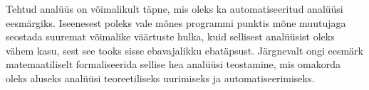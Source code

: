 \documentclass[../thesis.tex]{subfiles}
\begin{document}
\begin{itemize}
\begin{comment}
		Iseenesest poleks vale seostada selle programmi punktiga mõnda (osalise järjestuse järgi) üldisemat seisundit, nt $\{5, 6, 7\}$ või lausa $\top$, kuid see poleks nii kasulik, sest analüüsi mõte on siiski leida võimalikult täpne kirjeldus. Just selle täpsuse matemaatiliseks kirjeldamiseks nõutaksegi osalist järjestust.
	\item Punktiga 5 sobib samal põhjusel seostada element $\{3\}$.
	\item Punktis 6 on olukord huvitavam, sest seda seisundit pole programmis oleva hargnemise (täpsemalt selle ühendumise) tõttu kirjeldada ühe täisarvuga, vaid elemendiga $\{3, 5\}$. Selle tulemuseni jõudmiseks peab intuitiivselt ühendama eelneva kahe punkti seisundid --- leidma seisundi, mis hõlmaks eelnevaid, olles seejuures võimalikult täpne. Just selleks nõutaksegi ülemise raja leidmise tehet, millega seda teha. Antud juhul $\{3\} \sqcup \{5\} = \{3, 5\}$.
\end{comment}
\end{itemize}

Tehtud analüüs on võimalikult täpne, mis oleks ka automatiseeritud analüüsi eesmärgiks. Iseenesest poleks vale mõnes programmi punktis mõne muutujaga seostada suuremat võimalike väärtuste hulka, kuid sellisest analüüsist oleks vähem kasu, sest see tooks sisse ebavajalikku ebatäpsust.
Järgnevalt ongi eesmärk matemaatiliselt formaliseerida sellise hea analüüsi teostamine, mis omakorda oleks aluseks analüüsi teoreetiliseks uurimiseks ja automatiseerimiseks.
\end{document}
